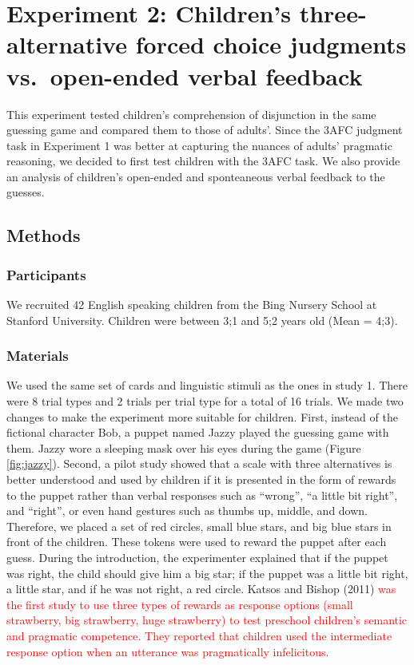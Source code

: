 \documentclass[,man,floatsintext]{apa6}
\begin{document}
\hypertarget{study2}{%
\section{Experiment 2: Children's three-alternative forced choice judgments vs.~open-ended verbal feedback}\label{study2}}

This experiment tested children's comprehension of disjunction in the same guessing game and compared them to those of adults'. Since the 3AFC judgment task in Experiment 1 was better at capturing the nuances of adults' pragmatic reasoning, we decided to first test children with the 3AFC task. We also provide an analysis of children's open-ended and sponteaneous verbal feedback to the guesses.

\hypertarget{methods-1}{%
\subsection{Methods}\label{methods-1}}

\hypertarget{participants-1}{%
\subsubsection{Participants}\label{participants-1}}

We recruited 42 English speaking children from the Bing Nursery School at Stanford University. Children were between 3;1 and 5;2 years old (Mean = 4;3).

\hypertarget{materials}{%
\subsubsection{Materials}\label{materials}}

We used the same set of cards and linguistic stimuli as the ones in study 1. There were 8 trial types and 2 trials per trial type for a total of 16 trials. We made two changes to make the experiment more suitable for children. First, instead of the fictional character Bob, a puppet named Jazzy played the guessing game with them. Jazzy wore a sleeping mask over his eyes during the game (Figure \ref{fig:jazzy}). Second, a pilot study showed that a scale with three alternatives is better understood and used by children if it is presented in the form of rewards to the puppet rather than verbal responses such as \enquote{wrong}, \enquote{a little bit right}, and \enquote{right}, or even hand gestures such as thumbs up, middle, and down. Therefore, we placed a set of red circles, small blue stars, and big blue stars in front of the children. These tokens were used to reward the puppet after each guess. During the introduction, the experimenter explained that if the puppet was right, the child should give him a big star; if the puppet was a little bit right, a little star, and if he was not right, a red circle. Katsos and Bishop (2011) \textcolor{red} {was the first study to use three types of rewards as response options (small strawberry, big strawberry, huge strawberry) to test preschool children's semantic and pragmatic competence. They reported that children used the intermediate response option when an utterance was pragmatically infelicitous.}
\end{document}
